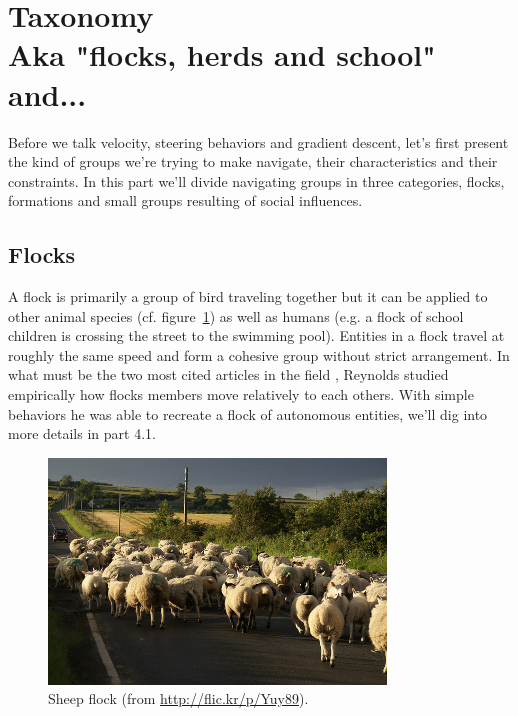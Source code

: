\documentclass{article}
\newcommand{\sectionwithsubtitle}[2]{\section[#1]{#1\\[1ex]\large#2}}
\begin{document}
\sectionwithsubtitle{Taxonomy}{Aka "flocks, herds and school" and...}
Before we talk velocity, steering behaviors and gradient descent, let’s first present the kind of groups we’re trying to make navigate, their characteristics and their constraints. In this part we’ll divide navigating groups in three categories, flocks, formations and small groups resulting of social influences.

\subsection{Flocks}

A flock is primarily a group of bird traveling together but it can be applied to other animal species (cf. figure~\ref{fig:sheep_flock}) as well as humans (e.g. a flock of school children is crossing the street to the swimming pool). Entities in a flock travel at roughly the same speed and form a cohesive group without strict arrangement. In what must be the two most cited articles in the field \cite{Reynolds:1987vm,Reynolds:1999vr}, Reynolds studied empirically how flocks members move relatively to each others. With simple behaviors he was able to recreate a flock of autonomous entities, we’ll dig into more details in part 4.1.

\begin{figure}[htb]
\centering
\includegraphics[width=0.8\textwidth]{SheepsHerd.jpg}
\caption{Sheep flock (from \url{http://flic.kr/p/Yuy89}).}
\label{fig:sheep_flock}
\end{figure}
\end{document}

